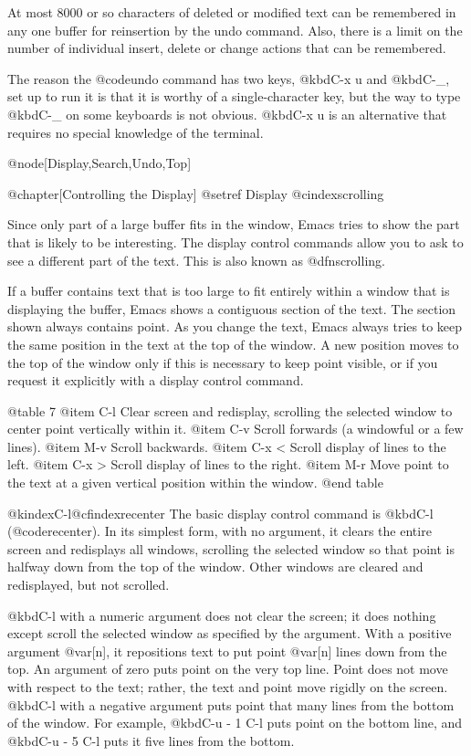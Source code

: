 {{{{{{  At most 8000 or so characters of deleted or modified text can be remembered
in any one buffer for reinsertion by the undo command.  Also, there is a limit
on the number of individual insert, delete or change actions that can be
remembered.

  The reason the @code{undo} command has two keys, @kbd{C-x u} and
@kbd{C-_}, set up to run it is that it is worthy of a single-character
key, but the way to type @kbd{C-_} on some keyboards is not obvious.
@kbd{C-x u} is an alternative that requires no special knowledge of
the terminal.

@node[Display,Search,Undo,Top]

@chapter[Controlling the Display]
@setref Display
@cindex{scrolling}

  Since only part of a large buffer fits in the window, Emacs tries to show
the part that is likely to be interesting.  The display control commands
allow you to ask to see a different part of the text.  This is also known
as @dfn{scrolling}.

  If a buffer contains text that is too large to fit entirely within a
window that is displaying the buffer, Emacs shows a contiguous section of
the text.  The section shown always contains point.  As you change the
text, Emacs always tries to keep the same position in the text at the top
of the window.  A new position moves to the top of the window only if this
is necessary to keep point visible, or if you request it explicitly with a
display control command.

@table 7
@item C-l
Clear screen and redisplay, scrolling the selected window to center point
vertically within it.
@item C-v
Scroll forwards (a windowful or a few lines).
@item M-v
Scroll backwards.
@item C-x <
Scroll display of lines to the left.
@item C-x >
Scroll display of lines to the right.
@item M-r
Move point to the text at a given vertical position within the window.
@end table

@kindex{C-l}@cfindex{recenter}
  The basic display control command is @kbd{C-l} (@code{recenter}).
In its simplest form, with no argument, it clears the entire screen
and redisplays all windows, scrolling the selected window so that
point is halfway down from the top of the window.  Other windows are
cleared and redisplayed, but not scrolled.

  @kbd{C-l} with a numeric argument does not clear the screen; it does
nothing except scroll the selected window as specified by the argument.
With a positive argument @var[n], it repositions text to put point @var[n]
lines down from the top.  An argument of zero puts point on the very top
line.  Point does not move with respect to the text; rather, the text and
point move rigidly on the screen.  @kbd{C-l} with a negative argument puts
point that many lines from the bottom of the window.  For example, @kbd{C-u
- 1 C-l} puts point on the bottom line, and @kbd{C-u - 5 C-l} puts it five
lines from the bottom.

}}}}}}
